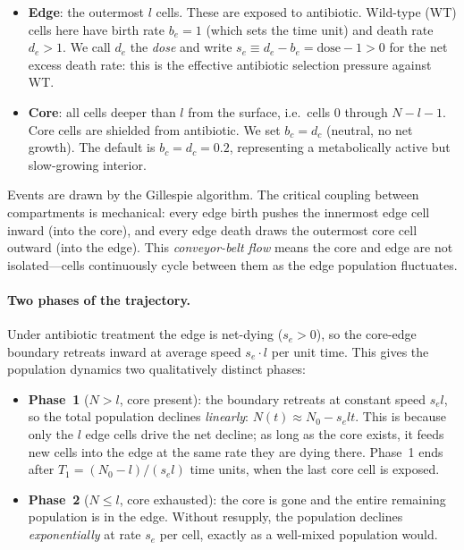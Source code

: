 \documentclass[12pt]{article}
\begin{document}
\begin{itemize}
    \item \textbf{Edge}: the outermost $l$ cells. These are exposed to
    antibiotic. Wild-type (WT) cells here have birth rate $b_e = 1$ (which
    sets the time unit) and death rate $d_e > 1$. We call $d_e$ the
    \emph{dose} and write $s_e \equiv d_e - b_e = \text{dose} - 1 > 0$ for
    the net excess death rate: this is the effective antibiotic selection
    pressure against WT.

    \item \textbf{Core}: all cells deeper than $l$ from the surface, i.e.\
    cells $0$ through $N - l - 1$. Core cells are shielded from antibiotic.
    We set $b_c = d_c$ (neutral, no net growth). The default is
    $b_c = d_c = 0.2$, representing a metabolically active but slow-growing
    interior.
\end{itemize}

Events are drawn by the Gillespie algorithm. The critical coupling between
compartments is mechanical: every edge birth pushes the innermost edge cell
inward (into the core), and every edge death draws the outermost core cell
outward (into the edge). This \emph{conveyor-belt flow} means the core and
edge are not isolated---cells continuously cycle between them as the edge
population fluctuates.

\paragraph{Two phases of the trajectory.}
Under antibiotic treatment the edge is net-dying ($s_e > 0$), so the
core-edge boundary retreats inward at average speed $s_e \cdot l$ per unit
time. This gives the population dynamics two qualitatively distinct phases:

\begin{itemize}
    \item \textbf{Phase~1} ($N > l$, core present): the boundary retreats
    at constant speed $s_e l$, so the total population declines
    \emph{linearly}: $N(t) \approx N_0 - s_e l t$. This is because only the
    $l$ edge cells drive the net decline; as long as the core exists, it
    feeds new cells into the edge at the same rate they are dying there.
    Phase~1 ends after $T_1 = (N_0 - l)/(s_e l)$ time units, when the last
    core cell is exposed.

    \item \textbf{Phase~2} ($N \leq l$, core exhausted): the core is gone
    and the entire remaining population is in the edge. Without resupply,
    the population declines \emph{exponentially} at rate $s_e$ per cell,
    exactly as a well-mixed population would.
\end{itemize}
\end{document}

